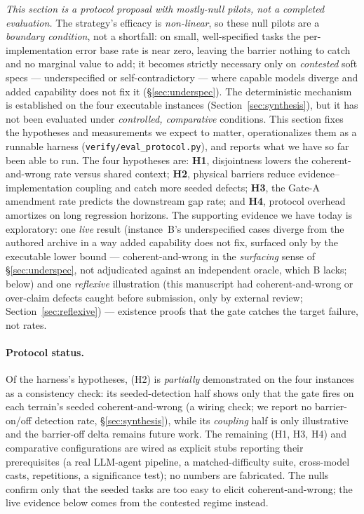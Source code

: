 \documentclass[11pt]{article}
\newcommand{\code}[1]{\texttt{#1}}
\begin{document}
\emph{This section is a protocol proposal with mostly-null pilots, not a completed
evaluation.} The strategy's efficacy is \emph{non-linear}, so these null pilots are a
\emph{boundary condition}, not a shortfall: on small, well-specified tasks the
per-implementation error base rate is near zero, leaving the barrier nothing to catch and no
marginal value to add; it becomes strictly necessary only on \emph{contested} soft specs ---
underspecified or self-contradictory --- where capable models diverge and added capability does
not fix it (\S\ref{sec:underspec}). The deterministic mechanism is established on the four executable instances
(Section~\ref{sec:synthesis}), but it has not been evaluated under \emph{controlled,
comparative} conditions. This section fixes the hypotheses and measurements we expect to matter,
operationalizes them as a runnable harness (\code{verify/\allowbreak eval\_protocol.py}), and
reports what we have so far been able to run. The four hypotheses are: \textbf{H1}, disjointness
lowers the coherent-and-wrong rate versus shared context; \textbf{H2}, physical barriers reduce
evidence--implementation coupling and catch more seeded defects; \textbf{H3}, the Gate-A amendment
rate predicts the downstream gap rate; and \textbf{H4}, protocol overhead amortizes on long
regression horizons. The supporting evidence we have today is
exploratory: one \emph{live} result (instance~B's underspecified cases diverge from the authored archive
in a way added capability does not fix, surfaced only by the executable lower bound --- coherent-and-wrong
in the \emph{surfacing} sense of \S\ref{sec:underspec}, not adjudicated against an independent oracle,
which B lacks; below) and one
\emph{reflexive} illustration (this manuscript had \ResReflexDefects{} coherent-and-wrong or
over-claim defects caught before submission, \ResCalibExternalCatches{} only by external review;
Section~\ref{sec:reflexive}) --- existence proofs that the gate catches the target failure, not
rates.

\paragraph{Protocol status.} Of the harness's \ResEvalHypTotal{} hypotheses,
\ResEvalHypMeasured{} (H2) is \emph{partially} demonstrated on the four instances as a
consistency check: its seeded-detection half shows only that the gate fires on each terrain's
seeded coherent-and-wrong (a wiring check; we report no barrier-on/off detection rate,
\S\ref{sec:synthesis}), while its \emph{coupling} half is only illustrative and the barrier-off
delta remains future work. The remaining \ResEvalHypPending{} (H1, H3, H4) and
\ResEvalConfigsPending{} comparative configurations are wired as explicit stubs reporting their
prerequisites (a real LLM-agent pipeline, a matched-difficulty suite, cross-model casts,
repetitions, a significance test); no numbers are fabricated. The nulls confirm only that the
seeded tasks are too easy to elicit coherent-and-wrong; the live evidence below comes from the
contested regime instead.
\end{document}
